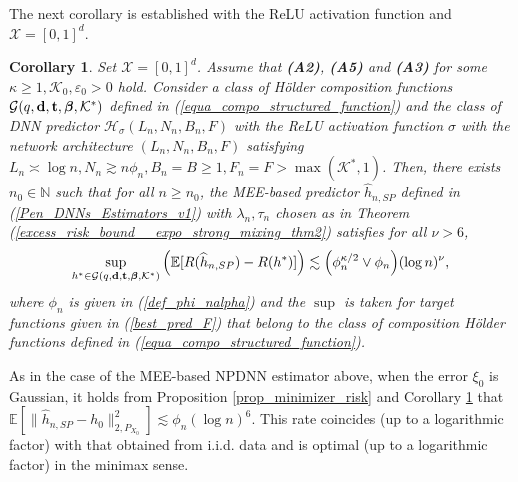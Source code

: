 \documentclass[10pt,twoside]{article}
\numberwithin{equation}{section}
\newtheorem{Corol}[thm]{Corollary}
\newcommand{\E}{\ensuremath{\mathbb{E}}}
\newcommand{\N}{\ensuremath{\mathbb{N}}}
\newcommand{\mk}{ { \mathcal{K}} }
\begin{document}
\noindent
The next corollary is established with the ReLU activation function and $\mathcal{X} = [0,1]^d$.
%
%
\begin{Corol}\label{excess_risk_bound_class_of_Holder_function_V2}
%
Set $\mathcal{X} = [0,1]^d$. Assume that \textbf{(A2)}, \textbf{(A5)} and  \textbf{(A3)} for some $\kappa \ge 1, \mk_0 , \varepsilon_0 > 0$ hold.
Consider a class of H\"older composition functions  $ \mathcal{G}(q, \bold{d}, \bold{t}, \boldsymbol{\beta}, \mk^{*})$ defined in (\ref{equa_compo_structured_function}) and the class of DNN predictor $\mathcal{H}_{\sigma}(L_n, N_n, B_n, F)$ with the ReLU activation function $\sigma$ with the network architecture $(L_n, N_n, B_n, F)$ satisfying $L_n\asymp \log n, N_n \gtrsim n \phi_n, B_n = B \geq 1 , F_n = F > \max(\mk^{*}, 1)$.
%
Then, there exists $n_0 \in \N$ such that for all $n \geq n_0$, the MEE-based predictor $\widehat{h}_{n,SP}$ defined in (\ref{Pen_DNNs_Estimators_v1}) with $\lambda_n, \tau_n$ chosen as in Theorem (\ref{excess_risk_bound__expo_strong_mixing_thm2}) satisfies for all $\nu > 6$, 
%
\begin{equation}\label{excess_risk_bound_corol01_v1}
\sup_{h^{*} \in \mathcal{G}(q, \bold{d}, \bold{t}, \boldsymbol{\beta}, \mk^{*}) } \Big(  \E[R(\widehat{h}_{n,SP}) - R(h^{*})] \Big)  \lesssim \Big( \phi_{n}^{\kappa/2} \lor \phi_n \Big)(\log n)^{\nu},  
\end{equation}
%
where $\phi_n$ is given in (\ref{def_phi_nalpha}) and the $\sup$ is taken for target functions given in (\ref{best_pred_F}) that belong to the class of composition H\"older functions defined in (\ref{equa_compo_structured_function}).
%
\end{Corol}
%

\noindent
As in the case of the MEE-based NPDNN estimator above, when the error $\xi_0$ is Gaussian, it holds from Proposition \ref{prop_minimizer_risk} and Corollary \ref{excess_risk_bound_class_of_Holder_function_V2} that   $\E[ \| \widehat{h}_{n,SP} - h_0\|_{2, P_{X_0}}^2 ] \lesssim  \phi_n (\log n)^{6}$.
 This rate coincides (up to a logarithmic factor) with that obtained from i.i.d. data and is optimal (up to a logarithmic factor) in the minimax sense.
 
\end{document}
